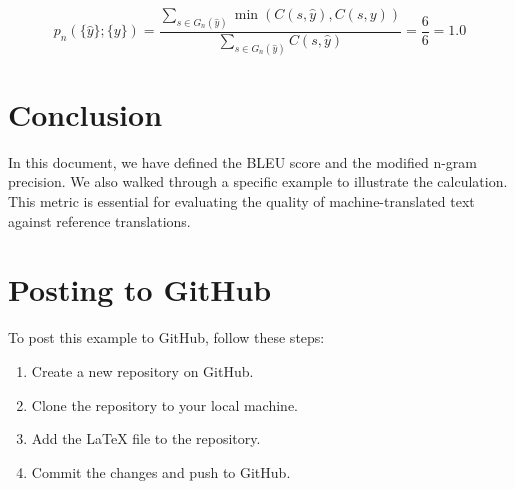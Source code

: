 \documentclass{article}
\begin{document}
\begin{equation}
p_{n}(\{\hat{y}\}; \{y\}) = \frac{\sum_{s \in G_{n}(\hat{y})} \min(C(s, \hat{y}), C(s, y))}{\sum_{s \in G_{n}(\hat{y})} C(s, \hat{y})} = \frac{6}{6} = 1.0
\end{equation}

\section{Conclusion}
In this document, we have defined the BLEU score and the modified n-gram precision. We also walked through a specific example to illustrate the calculation. This metric is essential for evaluating the quality of machine-translated text against reference translations.

\section{Posting to GitHub}
To post this example to GitHub, follow these steps:
\begin{enumerate}
    \item Create a new repository on GitHub.
    \item Clone the repository to your local machine.
    \item Add the LaTeX file to the repository.
    \item Commit the changes and push to GitHub.
\end{enumerate}
\end{document}
